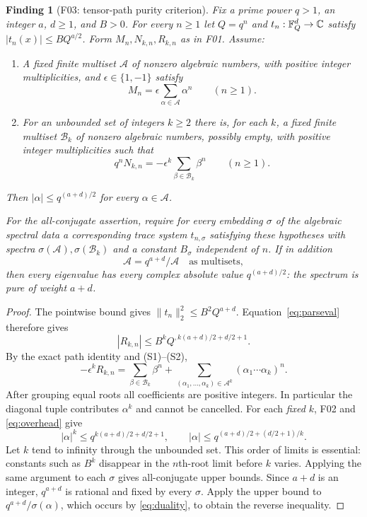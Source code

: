 \documentclass[11pt,a4paper]{article}
\newcommand{\fid}[1]{\textsf{#1}}\newcommand{\gate}[1]{\textsf{#1}}
\theoremstyle{named}\newtheorem{finding}{Finding}[section]
\theoremstyle{definition}\newtheorem{definition}[finding]{Definition}
\theoremstyle{remark}\newtheorem{remark}[finding]{Remark}
\begin{document}
\begin{finding}[\fid{F03}: tensor-path purity criterion]\label{f:criterion}
Fix a prime power $q>1$, an integer $a$, $d\ge1$, and $B>0$. For every $n\ge1$ let $Q=q^n$ and $t_n:\mathbb F_Q^d\to\mathbb C$ satisfy $|t_n(x)|\le BQ^{a/2}$. Form $M_n,N_{k,n},R_{k,n}$ as in \fid{F01}. Assume:
\begin{enumerate}[label=(S\arabic*)]
\item A fixed finite multiset $\mathcal A$ of nonzero algebraic numbers, with positive integer multiplicities, and $\epsilon\in\{1,-1\}$ satisfy
\[
 M_n=\epsilon\sum_{\alpha\in\mathcal A}\alpha^n\qquad(n\ge1).
\]
\item For an unbounded set of integers $k\ge2$ there is, for each $k$, a fixed finite multiset $\mathcal B_k$ of nonzero algebraic numbers, possibly empty, with positive integer multiplicities such that
\[
 q^nN_{k,n}=-\epsilon^k\sum_{\beta\in\mathcal B_k}\beta^n\qquad(n\ge1).
\]
\end{enumerate}
Then $|\alpha|\le q^{(a+d)/2}$ for every $\alpha\in\mathcal A$.

For the all-conjugate assertion, require for every embedding $\sigma$ of the algebraic spectral data a corresponding trace system $t_{n,\sigma}$ satisfying these hypotheses with spectra $\sigma(\mathcal A),\sigma(\mathcal B_k)$ and a constant $B_\sigma$ independent of $n$. If in addition
\begin{equation}\label{eq:duality}
 \mathcal A=q^{a+d}/\mathcal A
 \quad\text{as multisets},
\end{equation}
then every eigenvalue has every complex absolute value $q^{(a+d)/2}$: the spectrum is pure of weight $a+d$.
\end{finding}
\begin{proof}
The pointwise bound gives $\|t_n\|_2^2\le B^2Q^{a+d}$. Equation~\eqref{eq:parseval} therefore gives
\begin{equation}\label{eq:overhead}
 |R_{k,n}|\le B^kQ^{,k(a+d)/2+d/2+1}.
\end{equation}
By the exact path identity and (S1)--(S2),
\begin{equation}\label{eq:positivespectrum}
 -\epsilon^kR_{k,n}=
 \sum_{\beta\in\mathcal B_k}\beta^n+
 \sum_{(\alpha_1,\ldots,\alpha_k)\in\mathcal A^k}
 (\alpha_1\cdots\alpha_k)^n.
\end{equation}
After grouping equal roots all coefficients are positive integers. In particular the diagonal tuple contributes $\alpha^k$ and cannot be cancelled. For each \emph{fixed} $k$, \fid{F02} and \eqref{eq:overhead} give
\[
 |\alpha|^k\le q^{k(a+d)/2+d/2+1},\qquad
 |\alpha|\le q^{(a+d)/2+(d/2+1)/k}.
\]
Let $k$ tend to infinity through the unbounded set. This order of limits is essential: constants such as $B^k$ disappear in the $n$th-root limit before $k$ varies. Applying the same argument to each $\sigma$ gives all-conjugate upper bounds. Since $a+d$ is an integer, $q^{a+d}$ is rational and fixed by every $\sigma$. Apply the upper bound to $q^{a+d}/\sigma(\alpha)$, which occurs by \eqref{eq:duality}, to obtain the reverse inequality.
\end{proof}
\end{document}
